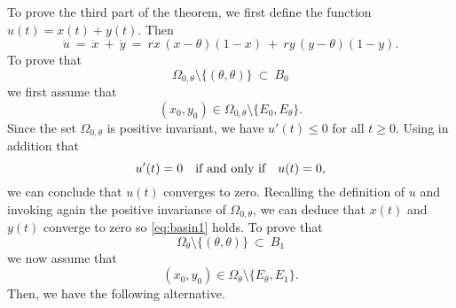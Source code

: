  To prove the third part of the theorem, we first define the function $u (t) = x (t) + y (t)$. Then
 $$ \dot{u} \ = \ \dot{x} \ + \ \dot{y} \ = \ r x \,(x - \theta) (1 - x) \ + \ r y \,(y - \theta) (1 - y). $$
 To prove that
\begin{equation}
\label{eq:basin1}
 \Omega_{0, \theta} \setminus \{(\theta, \theta) \} \ \subset \ B_0
\end{equation}
 we first assume that
 $$ (x_0, y_0) \in \Omega_{0, \theta} \setminus \{E_0, E_{\theta} \}. $$
 Since the set $\Omega_{0, \theta}$ is positive invariant, we have $u' (t) \leq 0$ for all $t \geq 0$.
 Using in addition that
 $$ u' (t) = 0 \quad \hbox{if and only if} \quad u (t) = 0, $$
 we can conclude that $u (t)$ converges to zero.
 Recalling the definition of $u$ and invoking again the positive invariance of $\Omega_{0, \theta}$, we can deduce that $x (t)$
 and $y (t)$ converge to zero so \eqref{eq:basin1} holds.
 To prove that
\begin{equation}
\label{eq:basin2}
 \Omega_{\theta} \setminus \{(\theta, \theta) \} \ \subset \ B_1
\end{equation}
 we now assume that
 $$ (x_0, y_0) \in \Omega_{\theta} \setminus \{E_{\theta}, E_1 \}. $$
 Then, we have the following alternative.
